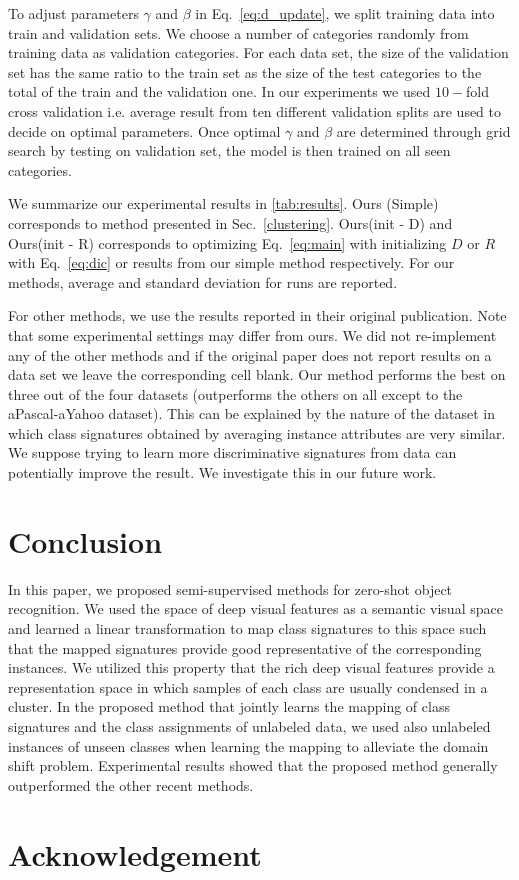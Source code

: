 \documentclass[10pt,twocolumn,letterpaper]{article}
\begin{document}
To adjust parameters $\gamma$ and $\beta$ in Eq.~\ref{eq:d_update}, we split training data into train and validation sets.
We choose a number of categories randomly from training data as validation categories. For each data set, the size of the
validation set has the same ratio to the train set as the size of the test categories to the total of the train and the validation one.
In our experiments we used $10-$fold cross validation i.e. average result from ten different validation splits are used to decide on
optimal parameters.
Once optimal $\gamma$ and $\beta$ are determined through grid search by testing on validation set, the model
is then trained on all seen categories.

We summarize our experimental results in \ref{tab:results}.
Ours (Simple) corresponds to method presented in Sec.~\ref{clustering}.
Ours(init - D) and Ours(init - R) corresponds to optimizing Eq.~\eqref{eq:main}
with initializing $D$ or $R$ with Eq.~\eqref{eq:dic} or results from our simple method respectively.
For our methods, average and standard deviation for runs are reported.

 For other methods, we use the results reported in their original publication. Note that some experimental settings may differ from ours. We did not re-implement any of the other methods and if the original paper does not report results on a data set we leave the corresponding cell blank.
Our method performs the best on three out of the four datasets (outperforms the others on all except to the aPascal-aYahoo dataset). This can be explained by the nature of the dataset in which class signatures obtained by averaging instance attributes are very similar. We suppose trying to learn
more discriminative signatures from data can potentially improve the result. We investigate this in our future work.


\section{Conclusion} \label{conclusion}
In this paper, we proposed semi-supervised methods for zero-shot object recognition. We used the space of deep visual features as a semantic visual space and learned a linear transformation to map class signatures to this space such that the mapped signatures provide good representative of the corresponding instances. We utilized this property that the rich deep visual features provide a representation space in which samples of each class are usually condensed in a cluster. In the proposed method that jointly learns the mapping of class signatures and the class assignments of unlabeled data, we used also unlabeled instances of unseen classes when learning the mapping to alleviate the domain shift problem. Experimental results showed that the proposed method generally outperformed the other recent methods.
\section*{Acknowledgement}
{\small


}
\end{document}
